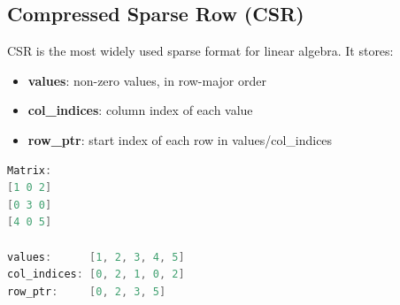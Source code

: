 \subsection{Compressed Sparse Row (CSR)}

CSR is the most widely used sparse format for linear algebra. It stores:
\begin{itemize}
\item \textbf{values}: non-zero values, in row-major order
\item \textbf{col\_indices}: column index of each value
\item \textbf{row\_ptr}: start index of each row in values/col\_indices
\end{itemize}

\begin{lstlisting}[language=Java]
Matrix:
[1 0 2]
[0 3 0]
[4 0 5]

values:      [1, 2, 3, 4, 5]
col_indices: [0, 2, 1, 0, 2]
row_ptr:     [0, 2, 3, 5]
\end{lstlisting}

